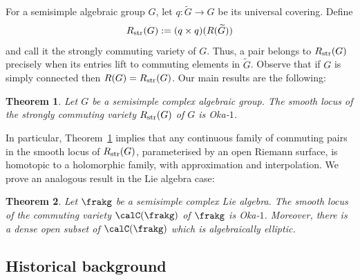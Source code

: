 \documentclass[12pt, a4paper, oneside]{amsart}
\theoremstyle{plain} %
\newtheorem{theorem}{Theorem}
\theoremstyle{definition} %
\theoremstyle{remark} %
\begin{document}
For a semisimple algebraic group $G$, let $q:\widetilde{G}\to G$ be its universal covering. Define 
\[R_{\rm str}(G) :=(q\times q)(R(\widetilde{G})) \]
and call it the strongly commuting variety of $G$. Thus, a pair belongs to $R_{\rm str}(G)$ precisely when its entries lift to commuting elements in $\widetilde{G}$. Observe that if $G$ is simply connected then $R(G) = R_{\rm str}(G)$. Our main results are the following:
\begin{theorem}\label{thm:theorem1}
Let $G$ be a semisimple complex algebraic group. The smooth locus of the strongly commuting variety $R_{\rm str}(G)$ of $G$ is Oka-$1$.
\end{theorem}
In particular, Theorem~\ref{thm:theorem1} implies that any continuous family of commuting pairs in the smooth locus of $R_{\rm str}(G)$, parameterised by an open Riemann surface, is homotopic to a holomorphic family, with approximation and interpolation. We prove an analogous result in the Lie algebra case:
\begin{theorem}\label{thm:theorem2}
Let $\frakg$ be a semisimple complex Lie algebra. The smooth locus of the commuting variety $\calC(\frakg)$ of $\frakg$ is Oka-$1$. Moreover, there is a dense open subset of $\calC(\frakg)$ which is algebraically elliptic.
\end{theorem}
\par
\endgroup
\makeatother




\makeatletter
\begingroup
\let\@tocwrite\@gobbletwo
\subsection*{Historical background}
\end{document}
